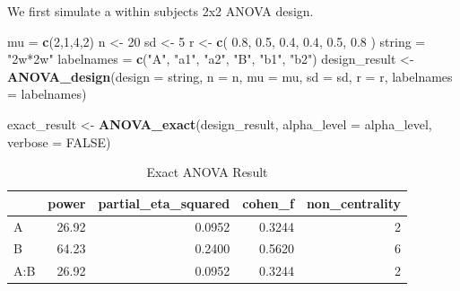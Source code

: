 \documentclass[]{book}
\newenvironment{Shaded}{\begin{snugshade}}{\end{snugshade}}
\newcommand{\DataTypeTok}[1]{\textcolor[rgb]{0.13,0.29,0.53}{#1}}
\newcommand{\DecValTok}[1]{\textcolor[rgb]{0.00,0.00,0.81}{#1}}
\newcommand{\FloatTok}[1]{\textcolor[rgb]{0.00,0.00,0.81}{#1}}
\newcommand{\KeywordTok}[1]{\textcolor[rgb]{0.13,0.29,0.53}{\textbf{#1}}}
\newcommand{\NormalTok}[1]{#1}
\newcommand{\OtherTok}[1]{\textcolor[rgb]{0.56,0.35,0.01}{#1}}
\newcommand{\StringTok}[1]{\textcolor[rgb]{0.31,0.60,0.02}{#1}}
\begin{document}
We first simulate a within subjects 2x2 ANOVA design.

\begin{Shaded}
\begin{Highlighting}[]
\NormalTok{mu =}\StringTok{ }\KeywordTok{c}\NormalTok{(}\DecValTok{2}\NormalTok{,}\DecValTok{1}\NormalTok{,}\DecValTok{4}\NormalTok{,}\DecValTok{2}\NormalTok{) }
\NormalTok{n <-}\StringTok{ }\DecValTok{20}
\NormalTok{sd <-}\StringTok{ }\DecValTok{5}
\NormalTok{r <-}\StringTok{ }\KeywordTok{c}\NormalTok{(}
  \FloatTok{0.8}\NormalTok{, }\FloatTok{0.5}\NormalTok{, }\FloatTok{0.4}\NormalTok{,}
       \FloatTok{0.4}\NormalTok{, }\FloatTok{0.5}\NormalTok{,}
            \FloatTok{0.8}
\NormalTok{  )}
\NormalTok{string =}\StringTok{ "2w*2w"}
\NormalTok{labelnames =}\StringTok{ }\KeywordTok{c}\NormalTok{(}\StringTok{"A"}\NormalTok{, }\StringTok{"a1"}\NormalTok{, }\StringTok{"a2"}\NormalTok{, }\StringTok{"B"}\NormalTok{, }\StringTok{"b1"}\NormalTok{, }\StringTok{"b2"}\NormalTok{)}
\NormalTok{design_result <-}\StringTok{ }\KeywordTok{ANOVA_design}\NormalTok{(}\DataTypeTok{design =}\NormalTok{ string,}
                              \DataTypeTok{n =}\NormalTok{ n, }
                              \DataTypeTok{mu =}\NormalTok{ mu, }
                              \DataTypeTok{sd =}\NormalTok{ sd, }
                              \DataTypeTok{r =}\NormalTok{ r, }
                              \DataTypeTok{labelnames =}\NormalTok{ labelnames)}

\NormalTok{exact_result <-}\StringTok{ }\KeywordTok{ANOVA_exact}\NormalTok{(design_result,}
                            \DataTypeTok{alpha_level =}\NormalTok{ alpha_level,}
                            \DataTypeTok{verbose =} \OtherTok{FALSE}\NormalTok{)}
\end{Highlighting}
\end{Shaded}

\begin{table}[t]

\caption{\label{tab:unnamed-chunk-260}Exact ANOVA Result}
\centering
\begin{tabular}{l|r|r|r|r}
\hline
  & power & partial\_eta\_squared & cohen\_f & non\_centrality\\
\hline
A & 26.92 & 0.0952 & 0.3244 & 2\\
\hline
B & 64.23 & 0.2400 & 0.5620 & 6\\
\hline
A:B & 26.92 & 0.0952 & 0.3244 & 2\\
\hline
\end{tabular}
\end{table}
\end{document}
